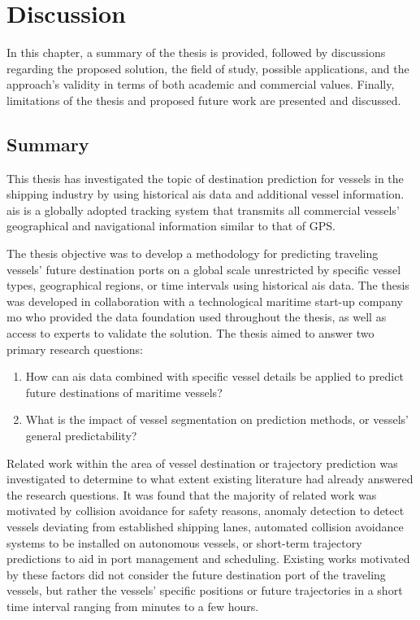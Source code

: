 \chapter{Discussion}
\label{chap:discussion}

In this chapter, a summary of the thesis is provided, followed by discussions regarding the proposed solution, the field of study, possible applications, and the approach's validity in terms of both academic and commercial values. Finally, limitations of the thesis and proposed future work are presented and discussed.

\section{Summary}
\label{sec:summary}

This thesis has investigated the topic of destination prediction for vessels in the shipping industry by using historical \acrfull{ais} data and additional vessel information. \acrshort{ais} is a globally adopted tracking system that transmits all commercial vessels' geographical and navigational information similar to that of GPS\@.

The thesis objective was to develop a methodology for predicting traveling vessels' future destination ports on a global scale unrestricted by specific vessel types, geographical regions, or time intervals using historical \acrshort{ais} data. The thesis was developed in collaboration with a technological maritime start-up company \acrfull{mo} who provided the data foundation used throughout the thesis, as well as access to experts to validate the solution. The thesis aimed to answer two primary research questions:

\begin{enumerate}
    \item How can \acrshort{ais} data combined with specific vessel details be applied to predict future destinations of maritime vessels?
    \item What is the impact of vessel segmentation on prediction methods, or vessels' general predictability?
\end{enumerate}

Related work within the area of vessel destination or trajectory prediction was investigated to determine to what extent existing literature had already answered the research questions. It was found that the majority of related work was motivated by collision avoidance for safety reasons, anomaly detection to detect vessels deviating from established shipping lanes, automated collision avoidance systems to be installed on autonomous vessels, or short-term trajectory predictions to aid in port management and scheduling. Existing works motivated by these factors did not consider the future destination port of the traveling vessels, but rather the vessels' specific positions or future trajectories in a short time interval ranging from minutes to a few hours.

